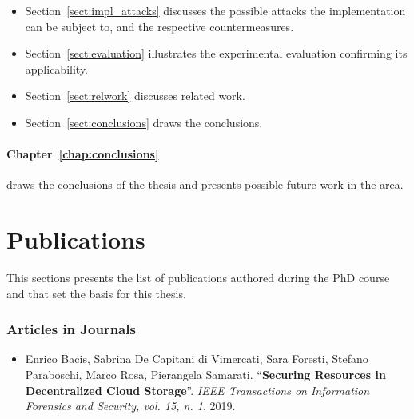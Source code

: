 {\begin{itemize}
\item Section~\ref{sect:impl_attacks} discusses the possible attacks the implementation can be subject to, and the respective countermeasures.

\item Section~\ref{sect:evaluation} illustrates the experimental evaluation confirming its applicability.

\item Section~\ref{sect:relwork} discusses related work.

\item Section~\ref{sect:conclusions} draws the conclusions.
\end{itemize}

\medskip

\paragraph*{Chapter~\ref{chap:conclusions}} draws the conclusions of the thesis and presents possible future work in the area.

\bigskip

%

\section{Publications}

This sections presents the list of publications authored during the PhD course and that set the basis for this thesis.
			
			
\subsubsection*{Articles in Journals}
\begin{itemize}
	\item Enrico Bacis, Sabrina De Capitani di Vimercati, Sara Foresti, Stefano Paraboschi,	Marco Rosa,	Pierangela Samarati. ``\textbf{Securing Resources in Decentralized Cloud Storage}''. {\em IEEE Transactions on Information Forensics and Security, vol. 15, n. 1}. 2019.
\end{itemize}

}
